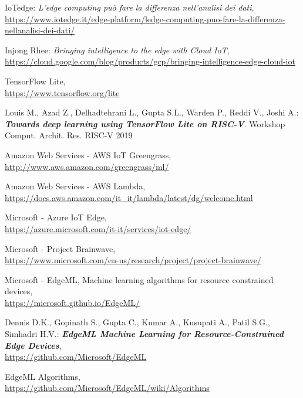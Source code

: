\documentclass[a4paper,12pt,oneside]{book}
\begin{document}
\begin{thebibliography}{9}
	
	IoTedge: \textit{L’edge computing può fare la differenza nell’analisi dei dati},
	\\\url{https://www.iotedge.it/edge-platform/ledge-computing-puo-fare-la-differenza-nellanalisi-dei-dati/}
	
	Injong Rhee: \textit{Bringing intelligence to the edge with Cloud IoT},
	\\\url{https://cloud.google.com/blog/products/gcp/bringing-intelligence-edge-cloud-iot}
		
	TensorFlow Lite,
	\\\url{https://www.tensorflow.org/lite}
	
	Louis M., Azad Z., Delhadtehrani L., Gupta S.L., Warden P., Reddi V., Joshi A.: \textbf{\textit{Towards deep learning using TensorFlow Lite on RISC-V}}. Workshop Comput. Archit. Res. RISC-V 2019
	
	Amazon Web Services - AWS IoT Greengrass,
	\\\url{http://www.aws.amazon.com/greengrass/ml/}
	
	Amazon Web Services - AWS Lambda,
	\\\url{https://docs.aws.amazon.com/it_it/lambda/latest/dg/welcome.html}
	
	Microsoft - Azure IoT Edge,
	\\\url{https://azure.microsoft.com/it-it/services/iot-edge/}
	
	Microsoft - Project Brainwave,
	\\\url{https://www.microsoft.com/en-us/research/project/project-brainwave/}
	
	Microsoft - EdgeML, Machine learning algorithms for resource constrained devices,
	\\\url{https://microsoft.github.io/EdgeML/}
	
	Dennis D.K., Gopinath S., Gupta C., Kumar A., Kusupati A., Patil S.G., Simhadri H.V.: \textbf{\textit{EdgeML Machine Learning for Resource-Constrained Edge Devices}},
	\\\url{https://github.com/Microsoft/EdgeML}
	
	EdgeML Algorithms,
	\\\url{https://github.com/Microsoft/EdgeML/wiki/Algorithms}
	

\end{thebibliography}
\end{document}
